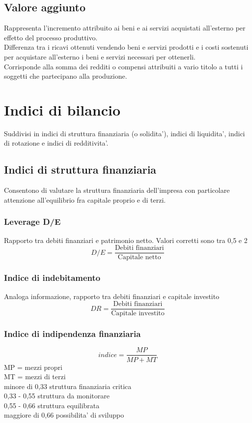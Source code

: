 \documentclass{report}
\begin{document}
	\subsection{Valore aggiunto}
	Rappresenta l'incremento attribuito ai beni e ai servizi acquistati all'esterno per effetto del processo produttivo.\\Differenza tra i ricavi ottenuti vendendo beni e servizi prodotti e i costi sostenuti per acquistare all'esterno i beni e servizi necessari per ottenerli.\\Corrisponde alla somma dei redditi o compensi attribuiti a vario titolo a tutti i soggetti che partecipano alla produzione.
	\section{Indici di bilancio}
	Suddivisi in indici di struttura finanziaria (o solidita'), indici di liquidita', indici di rotazione e indici di redditivita'.
	\subsection{Indici di struttura finanziaria}
	Consentono di valutare la struttura finanziaria dell'impresa con particolare attenzione all'equilibrio fra capitale proprio e di terzi.
	\subsubsection{Leverage D/E}
	Rapporto tra debiti finanziari e patrimonio netto. Valori corretti sono tra 0,5 e 2
	\[D/E = \frac{\text{Debiti finanziari}}{\text{Capitale netto}}\]
	\subsubsection{Indice di indebitamento}
	Analoga informazione, rapporto tra debiti finanziari e capitale investito
	\[DR = \frac{\text{Debiti finanziari}}{\text{Capitale investito}}\]
	\subsubsection{Indice di indipendenza finanziaria}
	\[indice = \frac{MP}{MP+MT}\]
	MP = mezzi propri\\MT = mezzi di terzi\\minore di 0,33 struttura finanziaria critica\\0,33 - 0,55 struttura da monitorare\\0,55 - 0,66 struttura equilibrata\\maggiore di 0,66 possibilita' di sviluppo
\end{document}
